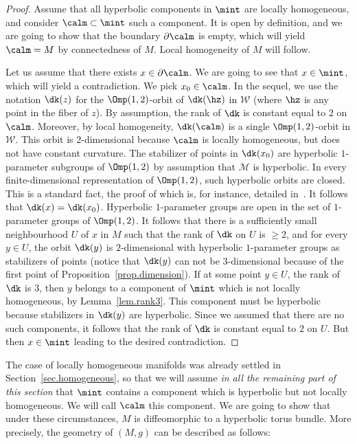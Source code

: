 \begin{proof}
Assume that all hyperbolic components in $\mint$ are locally homogeneous, and consider $\calm \subset \mint$ such a component. It is open by definition, and we are going to show that the boundary $\partial \calm$ is empty, which will yield $\calm=M$ by connectedness of $M$. Local homogeneity of $M$ will follow.

Let us assume that there exists $x \in \partial \calm$. We are going to see that $x \in \mint$, which will yield a contradiction. We pick $x_0 \in \calm$. In the sequel, we use the notation $\dk(z)$ for the $\Omp(1,2)$-orbit of $\dk(\hz)$ in ${\mathcal W}$ (where $\hz$ is any point in the fiber of $z$). By assumption, the rank of $\dk$ is constant equal to $2$ on $\calm$. Moreover, by local homogeneity, $\dk({\calm})$ is a single $\Omp(1,2)$-orbit in ${\mathcal W}$. This orbit is $2$-dimensional because $\calm$ is locally homogeneous, but does not have constant curvature. The stabilizer of points in $\dk(x_0)$ are hyperbolic $1$-parameter subgroups of $\Omp(1,2)$ by assumption that ${\mathcal M}$ is hyperbolic. In every finite-dimensional representation of $\Omp(1,2)$, such hyperbolic orbits are closed. This is a standard fact, the proof of which is, for instance, detailed in~\cite[Appendix~B]{frances.open}. It follows that $\dk(x)=\dk(x_0)$. Hyperbolic $1$-parameter groups are open in the set of $1$-parameter groups of $\Omp(1,2)$. It follows that there is a sufficiently small neighbourhood $U$ of $x$ in $M$ such that the rank of $\dk$ on $U$ is $\geq 2$, and for every $y \in U$, the orbit $\dk(y)$ is $2$-dimensional with hyperbolic $1$-parameter groups as stabilizers of points (notice that $\dk(y)$ can not be $3$-dimensional because of the first point of Proposition~\ref{prop.dimension}). If at some point $y \in U$, the rank of $\dk$ is $3$, then $y$ belongs to a component of $\mint$ which is not locally homogeneous, by Lemma~\ref{lem.rank3}. This component must be hyperbolic because stabilizers in $\dk(y)$ are hyperbolic. Since we assumed that there are no such components, it follows that the rank of $\dk$ is constant equal to $2$ on $U$. But then $x \in \mint$ leading to the desired contradiction.
\end{proof}

The case of locally homogeneous manifolds was already settled in Section~\ref{sec.homogeneous}, so that we will assume \emph{in all the remaining part of this section} that $\mint$ contains a component which is hyperbolic but not locally homogeneous. We will call $\calm$ this component. We are going to show that under these circumstances, $M$ is diffeomorphic to a hyperbolic torus bundle. More precisely, the geometry of $(M,g)$ can be described as follows:

